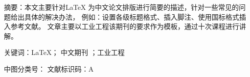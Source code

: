\noindent \heiti 摘要：\songti 本文主要针对\LaTeX 
为中文论文排版进行简要的描述，针对一些常见的问题给出具体的解决办法，
例如：设置各级标题格式、插入脚注、使用国标格式插入参考文献。
文章主要以工业工程该期刊的要求作为模板，通过十次课程进行讲解。

\noindent\heiti 关键词：\songti \LaTeX ； 中文期刊 ；工业工程 \par
\noindent\heiti 中图分类号： \hspace{3cm}     \heiti 文献标识码：\songti A  \\
